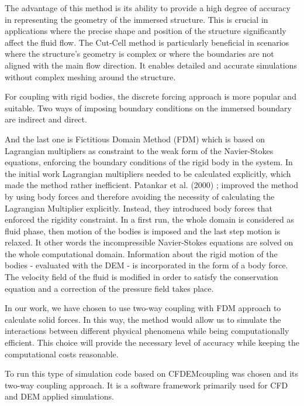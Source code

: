 The advantage of this method is its ability to provide a high degree of accuracy in representing the geometry of the immersed structure. This is crucial in applications where the precise shape and position of the structure significantly affect the fluid flow. The Cut-Cell method is particularly beneficial in scenarios where the structure's geometry is complex or where the boundaries are not aligned with the main flow direction. It enables detailed and accurate simulations without complex meshing around the structure. 

For coupling with rigid bodies, the discrete forcing approach is more popular and suitable. Two ways of imposing boundary conditions on the immersed boundary are indirect and direct.

And the last one is Fictitious Domain Method (\ac{FDM}) which is based on Lagrangian multipliers as constraint to the weak form of the Navier-Stokes equations, enforcing the boundary conditions of the rigid body in the system. In the initial work Lagrangian multipliers needed to be calculated explicitly, which made the method rather inefficient. Patankar et al. (2000) \cite{patankar2000new}; improved the method by using body forces and therefore avoiding the necessity of calculating the Lagrangian Multiplier explicitly. Instead, they introduced body forces that enforced the rigidity constraint. In a first run, the whole domain is considered as fluid phase, then motion of the bodies is imposed and the last step motion is relaxed. It other words the incompressible Navier-Stokes equations are solved on the whole computational domain. Information about the rigid motion of the bodies - evaluated with the DEM - is incorporated in the form of a body force. The velocity field of the fluid is modified in order to satisfy the conservation equation and a correction of the pressure field takes place.

In our work, we have chosen to use two-way coupling with FDM approach to calculate solid forces. In this way, the method would allow us to simulate the interactions between different physical phenomena while being computationally efficient. This choice will provide the necessary level of accuracy while keeping the computational costs reasonable.

To run this type of simulation code based on CFDEMcoupling \cite{kloss2011liggghts} was chosen and its two-way coupling approach. It is a software framework primarily used for CFD and DEM applied simulations.

